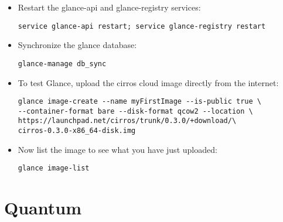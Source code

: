 \begin{itemize}
\begin{verbatim}
[paste_deploy]  
flavor = keystone
\end{verbatim}


\item Restart the glance-api and glance-registry services:

\begin{verbatim}
service glance-api restart; service glance-registry restart
\end{verbatim}


\item Synchronize the glance database:

\begin{verbatim}
glance-manage db_sync
\end{verbatim}


\item To test Glance, upload the cirros cloud image directly from the internet:

\begin{verbatim}
glance image-create --name myFirstImage --is-public true \
--container-format bare --disk-format qcow2 --location \
https://launchpad.net/cirros/trunk/0.3.0/+download/\
cirros-0.3.0-x86_64-disk.img
\end{verbatim}


\item Now list the image to see what you have just uploaded:

\begin{verbatim}
glance image-list
\end{verbatim}


\end{itemize}

\section{Quantum}
\label{quantum}

